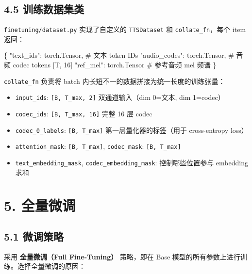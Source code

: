 \documentclass[
  english,
  letterpaper,
  DIV=11,
  numbers=noendperiod]{scrartcl}
\newenvironment{Shaded}{\begin{snugshade}}{\end{snugshade}}
\newcommand{\CommentTok}[1]{\textcolor[rgb]{0.37,0.37,0.37}{#1}}
\newcommand{\NormalTok}[1]{\textcolor[rgb]{0.00,0.23,0.31}{#1}}
\newcommand{\StringTok}[1]{\textcolor[rgb]{0.13,0.47,0.30}{#1}}
\providecommand{\tightlist}{%
  \setlength{\itemsep}{0pt}\setlength{\parskip}{0pt}}
\begin{document}
\subsection{4.5
训练数据集类}\label{ux8badux7ec3ux6570ux636eux96c6ux7c7b}

\texttt{finetuning/dataset.py} 实现了自定义的 \texttt{TTSDataset} 和
\texttt{collate\_fn}，每个 item 返回：

\begin{Shaded}
\begin{Highlighting}[]
\NormalTok{\{}
    \StringTok{"text\_ids"}\NormalTok{: torch.Tensor,      }\CommentTok{\# 文本 token IDs}
    \StringTok{"audio\_codes"}\NormalTok{: torch.Tensor,   }\CommentTok{\# 音频 codec tokens [T, 16]}
    \StringTok{"ref\_mel"}\NormalTok{: torch.Tensor        }\CommentTok{\# 参考音频 mel 频谱}
\NormalTok{\}}
\end{Highlighting}
\end{Shaded}

\texttt{collate\_fn} 负责将 batch
内长短不一的数据拼接为统一长度的训练张量：

\begin{itemize}
\tightlist
\item
  \texttt{input\_ids}: \texttt{{[}B,\ T\_max,\ 2{]}} 双通道输入（dim
  0=文本, dim 1=codec）
\item
  \texttt{codec\_ids}: \texttt{{[}B,\ T\_max,\ 16{]}} 完整 16 层 codec
\item
  \texttt{codec\_0\_labels}: \texttt{{[}B,\ T\_max{]}}
  第一层量化器的标签（用于 cross-entropy loss）
\item
  \texttt{attention\_mask}: \texttt{{[}B,\ T\_max{]}},
  \texttt{codec\_mask}: \texttt{{[}B,\ T\_max{]}}
\item
  \texttt{text\_embedding\_mask}, \texttt{codec\_embedding\_mask}:
  控制哪些位置参与 embedding 求和
\end{itemize}

\section{5. 全量微调}\label{sec-finetune}

\subsection{5.1 微调策略}\label{ux5faeux8c03ux7b56ux7565}

采用 \textbf{全量微调（Full Fine-Tuning）} 策略，即在 Base
模型的所有参数上进行训练。选择全量微调的原因：
\end{document}
